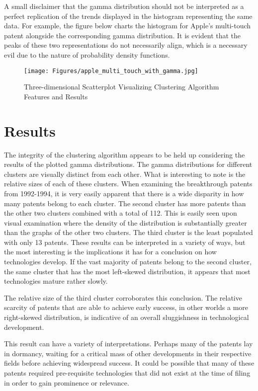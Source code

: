 A small disclaimer that the gamma distribution should not be interpreted as a perfect replication of the trends displayed in the histogram representing the same data. For example, the figure below charts the histogram for Apple's multi-touch patent alongside the corresponding gamma distribution. It is evident that the peaks of these two representations do not necessarily align, which is a necessary evil due to the nature of probability density functions. 
\begin{figure}[H]
    \centering
    \texttt{[image: Figures/apple\_multi\_touch\_with\_gamma.jpg]}
    \caption{Three-dimensional Scatterplot Visualizing Clustering Algorithm Features and Results}
    \label{fig:my_first_figure}
\end{figure}
\section{Results}

The integrity of the clustering algorithm appears to be held up considering the results of the plotted gamma distributions. The gamma distributions for different clusters are visually distinct from each other. What is interesting to note is the relative sizes of each of these clusters. When examining the breakthrough patents from 1992-1994, it is very easily apparent that there is a wide disparity in how many patents belong to each cluster. The second cluster has more patents than the other two clusters combined with a total of 112. This is easily seen upon visual examination where the density of the distribution is substantially greater than the graphs of the other two clusters. The third cluster is the least populated with only 13 patents. These results can be interpreted in a variety of ways, but the most interesting is the implications it has for a conclusion on how technologies develop. If the vast majority of patents belong to the second cluster, the same cluster that has the most left-skewed distribution, it appears that most technologies mature rather slowly. 

The relative size of the third cluster corroborates this conclusion. The relative scarcity of patents that are able to achieve early success, in other worlds a more right-skewed distribution, is indicative of an overall sluggishness in technological development.

This result can have a variety of interpretations. Perhaps many of the patents lay in dormancy, waiting for a critical mass of other developments in their respective fields before achieving widespread success. It could be possible that many of these patents required pre-requisite technologies that did not exist at the time of filing in order to gain prominence or relevance. 

